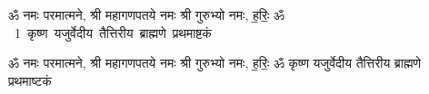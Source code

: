 \documentclass[17pt]{extarticle}
\begin{document}
\begin{titlepage}
    \begin{center}
 
\begin{sanskrit}
    { \Large
    ॐ नमः परमात्मने, श्री महागणपतये नमः 
श्री गुरुभ्यो नमः, ह॒रिः॒ ॐ 
    }
    \\
    \vspace{2.5cm}
    \mbox{ \Huge
    1       कृष्ण यजुर्वेदीय तैत्तिरीय ब्राह्मणे प्रथमाष्टकं    }
\end{sanskrit}
\end{center}

\end{titlepage}
\tableofcontents
\pagebreak
ॐ नमः परमात्मने, श्री महागणपतये नमः 
श्री गुरुभ्यो नमः, ह॒रिः॒ ॐ        कृष्ण यजुर्वेदीय तैत्तिरीय ब्राह्मणे प्रथमाष्टकं  \newline
\end{document}
